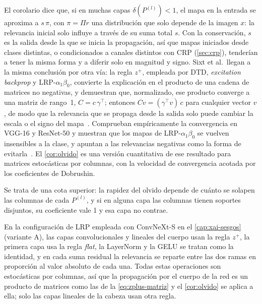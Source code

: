 El corolario dice que, si en muchas capas $\delta(P^{(l)}) < 1$, el mapa en la entrada se aproxima a $s\, \pi$, con $\pi = \Pi r$ una distribución que solo depende de la imagen $x$: la relevancia inicial solo influye a través de su suma total $s$. Con la conservación, $s$ es la salida desde la que se inicia la propagación, así que mapas iniciados desde clases distintas, o condicionados a canales distintos con CRP (\cref{sec:crp}), tenderían a tener la misma forma y a diferir solo en magnitud y signo. Sixt et al.\ llegan a la misma conclusión por otra vía: la regla $z^{+}$, empleada por DTD, \emph{excitation backprop} y LRP-$\alpha_1\beta_0$, convierte la explicación en el producto de una cadena de matrices no negativas, y demuestran que, normalizado, ese producto converge a una matriz de rango~1, $C = c\,\gamma^{\top}$; entonces $C v = (\gamma^{\top} v)\, c$ para cualquier vector $v$, de modo que la relevancia que se propaga desde la salida solo puede cambiar la escala o el signo del mapa~\cite[sec.~2 y teorema~1]{sixt2020}. Comprueban empíricamente la convergencia en VGG-16 y ResNet-50 y muestran que los mapas de LRP-$\alpha_1\beta_0$ se vuelven insensibles a la clase, y apuntan a las relevancias negativas como la forma de evitarla~\cite{sixt2020}. El \cref{cor:olvido} es una versión cuantitativa de ese resultado para matrices estocásticas por columnas, con la velocidad de convergencia acotada por los coeficientes de Dobrushin.

Se trata de una cota superior: la rapidez del olvido depende de cuánto se solapen las columnas de cada $P^{(l)}$, y si en alguna capa las columnas tienen soportes disjuntos, su coeficiente vale 1 y esa capa no contrae.

En la configuración de LRP empleada con ConvNeXt-S en el \cref{cap:xai-sesgos} (variante A), las capas convolucionales y lineales del cuerpo usan la regla $z^{+}$, la primera capa usa la regla \emph{flat}, la LayerNorm y la GELU se tratan como la identidad, y en cada suma residual la relevancia se reparte entre las dos ramas en proporción al valor absoluto de cada una. Todas estas operaciones son estocásticas por columnas, así que la propagación por el cuerpo de la red es un producto de matrices como las de la \cref{eq:zplus-matriz} y el \cref{cor:olvido} se aplica a ella; solo las capas lineales de la cabeza usan otra regla.

